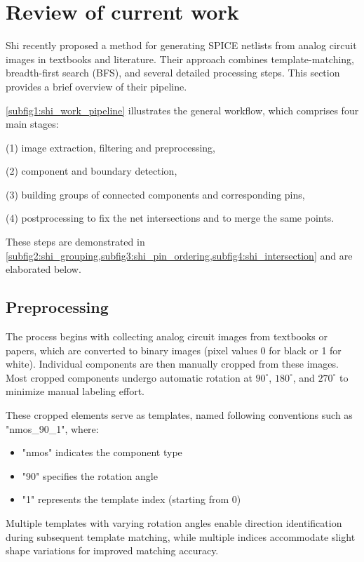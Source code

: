 \documentclass{article}
\begin{document}
\section{Review of current work}\label{sec:review_of_current_work}

Shi \etal \cite{shi2024amsnet} recently proposed a method for generating SPICE netlists from analog circuit images in textbooks and literature. 
Their approach combines template-matching, breadth-first search (BFS), and several detailed processing steps. 
This section provides a brief overview of their pipeline. 

\cref{subfig1:shi_work_pipeline} illustrates the general workflow, which comprises four main stages:

(1) image extraction, filtering and preprocessing, 

(2) component and boundary detection, 

(3) building groups of connected components and corresponding pins,

(4) postprocessing to fix the net intersections and to merge the same points. 

These steps are demonstrated in \cref{subfig2:shi_grouping,subfig3:shi_pin_ordering,subfig4:shi_intersection} and are elaborated below.

\subsection{Preprocessing}

The process begins with collecting analog circuit images from textbooks or papers, 
which are converted to binary images (pixel values 0 for black or 1 for white). 
Individual components are then manually cropped from these images. 
Most cropped components undergo automatic rotation at $90^\circ$, $180^\circ$, and $270^\circ$ to minimize manual labeling effort.

These cropped elements serve as templates, named following conventions such as "nmos\_90\_1", where:
\begin{itemize}
\item "nmos" indicates the component type
\item "90" specifies the rotation angle
\item"1" represents the template index (starting from 0)
\end{itemize}
Multiple templates with varying rotation angles enable direction identification during subsequent template matching, 
while multiple indices accommodate slight shape variations for improved matching accuracy.
\end{document}
